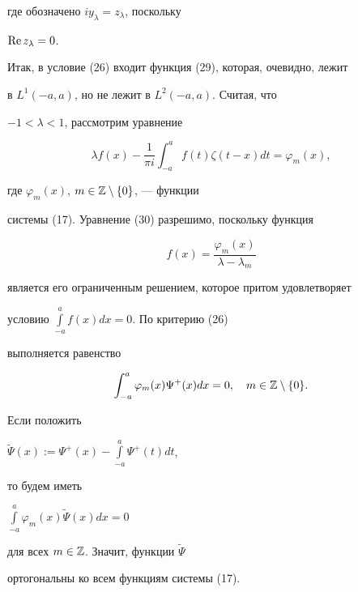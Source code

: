 где обозначено $iy_{\lambda}=z_{\lambda}$, поскольку


$\operatorname{Re} z_{\lambda}=0$.





Итак, в условие (26) входит функция (29), которая, очевидно, лежит


в $L^{1}(-a,a)$, но не лежит в $L^{2}(-a,a)$. Считая, что


$-1<\lambda<1$, рассмотрим уравнение


\begin{equation}


\lambda f(x)-\dfrac{1}{\pi i}\int^{a}_{-a}f(t)\zeta(t-x)dt=


\varphi_{m}(x),


\end{equation}


где $\varphi_{m}(x)$, $m\in\Bbb{Z}\setminus\{0\}$, --- функции


системы (17). Уравнение (30) разрешимо, поскольку функция


$$


f(x)=\dfrac{\varphi_{m}(x)}{\lambda-\lambda_{m}}


$$


является его ограниченным решением, которое притом удовлетворяет


условию $\int\limits^{a}_{-a}f(x)dx=0$. По критерию (26)


выполняется равенство


$$


\int^{a}_{-a}\varphi_{m}(x)\Psi^{+}(x)dx=0,


\quad m\in \Bbb{Z}\setminus\{0\}.


$$


Если положить


$\widetilde{\Psi}(x):=\Psi^{+}(x)-


\int\limits^{a}_{-a}\Psi^{+}(t)dt$,


то будем иметь


$\int\limits^{a}_{-a}\varphi_{m}(x)\widetilde{\Psi}(x)dx=0$


для всех $m\in \Bbb{Z}$. Значит, функции  $\widetilde{\Psi}$


ортогональны ко всем функциям системы (17).








